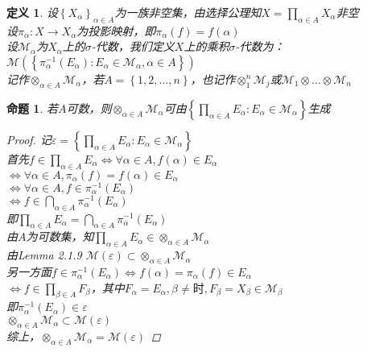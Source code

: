 \documentclass[12pt, a4paper, oneside]{ctexbook}
\newtheorem{definition}[theorem]{定义}
\newtheorem{proposition}[theorem]{命题}
\begin{document}
\begin{definition}
    设$\left\{X_{\alpha}\right\}_{\alpha\in A}$为一族非空集，由选择公理知$X=\prod_{\alpha\in A}X_{\alpha}$非空\\
    设$\pi_{\alpha}:X\rightarrow X_{\alpha}$为投影映射，即$\pi_{\alpha}(f)=f(\alpha)$\\
    设$\mathcal{M}_{\alpha}$为$X_{\alpha}$上的$\sigma$-代数，我们定义$X$上的乘积$\sigma$-代数为：\\
    $\mathcal{M}(\left\{\pi^{-1}_{\alpha}(E_{\alpha}):E_{\alpha}\in\mathcal{M}_{\alpha},\alpha\in A\right\})$\\
    记作$\otimes _{\alpha\in A}\mathcal{M}_{\alpha}$，若$A=\left\{1,2,\dots,n\right\}$，也记作$\otimes _{1}^{n}\mathcal{M}_j$或$\mathcal{M}_1\otimes\dots\otimes\mathcal{M}_n$
\end{definition}
\begin{proposition}
    若$A$可数，则$\otimes_{\alpha\in A}\mathcal{M}_{\alpha}$可由$\left\{\prod_{\alpha\in A}E_{\alpha}:E_{\alpha}\in\mathcal{M}_{\alpha}\right\}$生成
    \begin{proof}
        记$\varepsilon=\left\{\prod_{\alpha\in A}E_{\alpha}:E_{\alpha}\in\mathcal{M}_{\alpha}\right\}$\\
        首先$f\in\prod_{\alpha\in A}E_{\alpha}\Leftrightarrow\forall\alpha\in A,f(\alpha)\in E_{\alpha}$\\
        $\Leftrightarrow\forall\alpha\in A,\pi_{\alpha}(f)=f(\alpha)\in E_{\alpha}$\\
        $\Leftrightarrow\forall\alpha\in A,f\in\pi_{\alpha}^{-1}(E_{\alpha})$\\
        $\Leftrightarrow f\in\bigcap_{\alpha\in A}\pi_{\alpha}^{-1}(E_{\alpha})$\\
        即$\prod_{\alpha\in A}E_{\alpha}=\bigcap_{\alpha\in A}\pi_{\alpha}^{-1}(E_{\alpha})$\\
        由$A$为可数集，知$\prod_{\alpha\in A}E_{\alpha}\in\otimes_{\alpha\in A}\mathcal{M}_{\alpha}$\\
        由Lemma 2.1.9 $\mathcal{M}(\varepsilon)\subset\otimes_{\alpha\in A}\mathcal{M}_{\alpha}$\\
        另一方面$f\in\pi_{\alpha}^{-1}(E_{\alpha})\Leftrightarrow f(\alpha)=\pi_{\alpha}(f)\in E_{\alpha}$\\
        $\Leftrightarrow f\in\prod_{\beta\in A}F_{\beta}$，其中$F_{\alpha}=E_{\alpha},\beta\neq\text{时},F_{\beta}=X_{\beta}\in\mathcal{M}_{\beta}$\\
        即$\pi_{\alpha}^{-1}(E_{\alpha})\in\varepsilon$\\
        $\otimes_{\alpha\in A}\mathcal{M}_{\alpha}\subset\mathcal{M}(\varepsilon)$\\
        综上，$\otimes_{\alpha\in A}\mathcal{M}_{\alpha}=\mathcal{M}(\varepsilon)$
    \end{proof}
\end{proposition}
\end{document}
